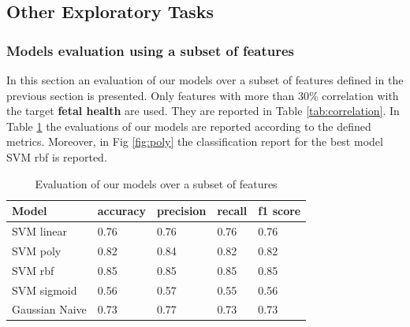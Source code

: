 \documentclass[a4paper,12pt]{article}
\begin{document}
\subsection{Other Exploratory Tasks}

\subsubsection{Models evaluation using a subset of features}

In this section an evaluation of our models over a subset of features defined in the previous section is presented. Only features with more than 30\% correlation with the target \textbf{fetal health} are used. They are reported in Table \ref{tab:correlation}. In Table \ref{tab:subset} the evaluations of our models are reported according to the defined metrics. Moreover, in Fig \ref{fig:poly} the classification report for the best model SVM rbf is reported.

\begin{table}[H]
\begin{tabular}{ |p{6cm}||p{2cm}|p{2cm}|p{2cm}|p{2cm}| }
  \hline
  Model& accuracy & precision  &  recall & f1 score \\
  \hline
  SVM linear &          0.76&   0.76&  0.76&  0.76\\
  SVM poly   &          0.82&   0.84&  0.82&  0.82\\
  SVM rbf    &          0.85&   0.85&  0.85&  0.85\\
  SVM sigmoid &         0.56&   0.57&  0.55&  0.56\\
  Gaussian Naive &         0.73&   0.77&  0.73&  0.73\\
  \hline
\end{tabular}
\caption{Evaluation of our models over a subset of features}
\label{tab:subset}
\end{table}
\end{document}
